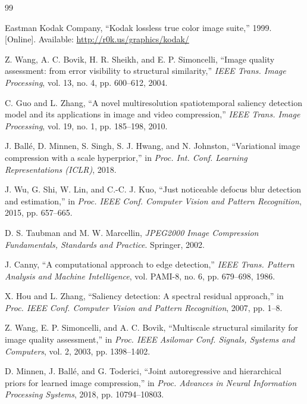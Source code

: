 \documentclass[conference]{IEEEtran}
\begin{document}
\begin{thebibliography}{99}

Eastman Kodak Company, ``Kodak lossless true color image suite,'' 1999. [Online]. Available: \url{http://r0k.us/graphics/kodak/}

Z. Wang, A. C. Bovik, H. R. Sheikh, and E. P. Simoncelli, ``Image quality assessment: from error visibility to structural similarity,'' \textit{IEEE Trans. Image Processing}, vol. 13, no. 4, pp. 600--612, 2004.

C. Guo and L. Zhang, ``A novel multiresolution spatiotemporal saliency detection model and its applications in image and video compression,'' \textit{IEEE Trans. Image Processing}, vol. 19, no. 1, pp. 185--198, 2010.

J. Ballé, D. Minnen, S. Singh, S. J. Hwang, and N. Johnston, ``Variational image compression with a scale hyperprior,'' in \textit{Proc. Int. Conf. Learning Representations (ICLR)}, 2018.

J. Wu, G. Shi, W. Lin, and C.-C. J. Kuo, ``Just noticeable defocus blur detection and estimation,'' in \textit{Proc. IEEE Conf. Computer Vision and Pattern Recognition}, 2015, pp. 657--665.

D. S. Taubman and M. W. Marcellin, \textit{JPEG2000 Image Compression Fundamentals, Standards and Practice}. Springer, 2002.

J. Canny, ``A computational approach to edge detection,'' \textit{IEEE Trans. Pattern Analysis and Machine Intelligence}, vol. PAMI-8, no. 6, pp. 679--698, 1986.

X. Hou and L. Zhang, ``Saliency detection: A spectral residual approach,'' in \textit{Proc. IEEE Conf. Computer Vision and Pattern Recognition}, 2007, pp. 1--8.

Z. Wang, E. P. Simoncelli, and A. C. Bovik, ``Multiscale structural similarity for image quality assessment,'' in \textit{Proc. IEEE Asilomar Conf. Signals, Systems and Computers}, vol. 2, 2003, pp. 1398--1402.

D. Minnen, J. Ballé, and G. Toderici, ``Joint autoregressive and hierarchical priors for learned image compression,'' in \textit{Proc. Advances in Neural Information Processing Systems}, 2018, pp. 10794--10803.

\end{thebibliography}
\end{document}

